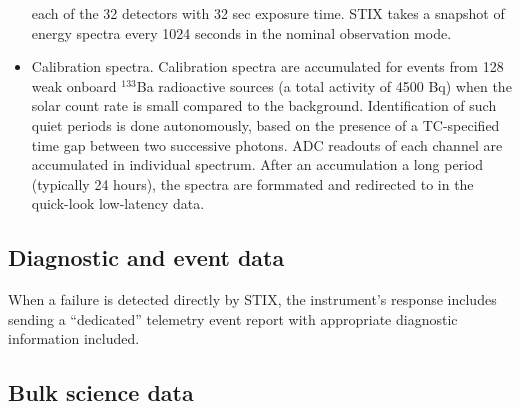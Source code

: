 \documentclass{aa}
\begin{document}
\begin{itemize}
each of the 32 detectors with 32 sec exposure time.
STIX takes a snapshot of energy spectra every 1024
seconds in the nominal observation mode.
\item Calibration spectra. Calibration spectra are accumulated for events from 128 weak onboard $^{133}$Ba radioactive sources 
(a total activity of 4500 Bq) 
 when the solar count rate is small compared to the background.
Identification of such quiet periods is done autonomously, based on the presence of a
TC-specified time gap between two successive photons.  
ADC readouts of each channel are accumulated in individual spectrum.
After an accumulation a long period (typically 24 hours),  the spectra are 
formmated and redirected to in the quick-look low-latency data.
\end{itemize}
\subsection{Diagnostic and event data}
When a failure is detected directly by STIX, the instrument’s response includes sending a
“dedicated” telemetry event report with appropriate diagnostic information included.

\subsection{Bulk science data}
\end{document}
